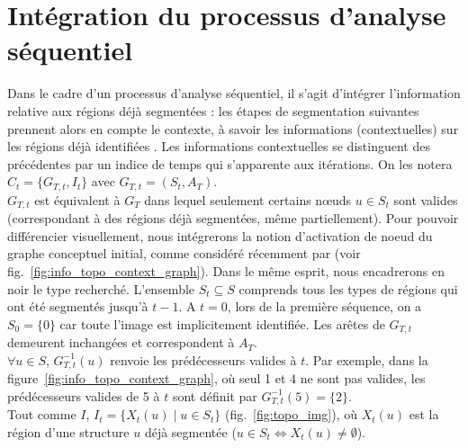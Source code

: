    \section{Intégration du processus d'analyse séquentiel}
	Dans le cadre d'un processus d'analyse séquentiel, il s'agit d'intégrer l'information relative aux régions déjà segmentées : les étapes de segmentation suivantes prennent alors en compte le contexte, à savoir les informations (contextuelles) sur les régions déjà identifiées \citep[Fasquel]{Fasquel2006}. Les informations contextuelles se distinguent des précédentes par un indice de temps qui s'apparente aux itérations. On les notera $C_t=\{G_{T,t}, I_t\}$ avec $G_{T,t}=(S_t,A_T)$.\\
	$G_{T,t}$ est équivalent à $G_T$ dans lequel seulement certains n\oe{}uds $u\in S_t$ sont valides (correspondant à des régions déjà segmentées, même partiellement). Pour pouvoir différencier visuellement, nous intégrerons la notion d'activation de noeud du graphe conceptuel initial, comme considéré récemment par \citep[Fasquel]{Fasquel2006} (voir fig.~\ref{fig:info_topo_context_graph}). Dans le même esprit, nous encadrerons en noir le type recherché. L'ensemble $S_t \subseteq S$ comprends tous les types de régions qui ont été segmentés jusqu'à $t-1$. A $t=0$, lors de la première séquence, on a $S_0=\{0\}$ car toute l'image est implicitement identifiée. Les arêtes de $G_{T,t}$ demeurent inchangées et correspondent à $A_T$.\\
	$\forall u \in S$, $G_{T,t}^{-1}(u)$ renvoie les prédécesseurs valides à $t$. Par exemple, dans la figure~\ref{fig:info_topo_context_graph}, où seul 1 et 4 ne sont pas valides, les prédécesseurs valides de 5 à $t$ sont définit par $G_{T,t}^{-1}(5)=\{2\}$.\\
	Tout comme $I$, $I_t = \{X_t(u)\;|\;u \in S_t\}$ (fig.~\ref{fig:topo_img}), où $X_t(u)$ est la région d'une structure $u$ déjà segmentée ($u \in S_t \Leftrightarrow X_t(u) \neq \emptyset$).


